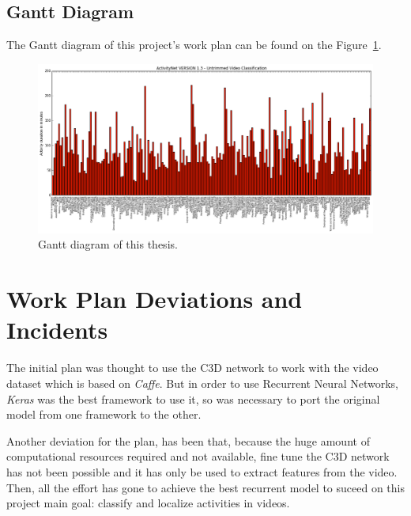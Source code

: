 \subsection{Gantt Diagram}

The Gantt diagram of this project's work plan can be found on the Figure~\ref{fig:gantt_diagram}.

\begin{figure}
\begin{center}
\includegraphics[width=1\linewidth]{img/methodology/dataset_stats}
\end{center}
\caption{Gantt diagram of this thesis.}
\label{fig:gantt_diagram}
\end{figure}

\section{Work Plan Deviations and Incidents}
\label{section:work_plan_deviations}

The initial plan was thought to use the C3D\cite{tran2014learning} network to work with the video dataset which is based on \textit{Caffe}. But in order to use Recurrent Neural Networks, \textit{Keras} was the best framework to use it, so was necessary to port the original model from one framework to the other.

Another deviation for the plan, has been that, because the huge amount of computational resources required and not available, fine tune the C3D network has not been possible and it has only be used to extract features from the video. Then, all the effort has gone to achieve the best recurrent model to suceed on this project main goal: classify and localize activities in videos.
